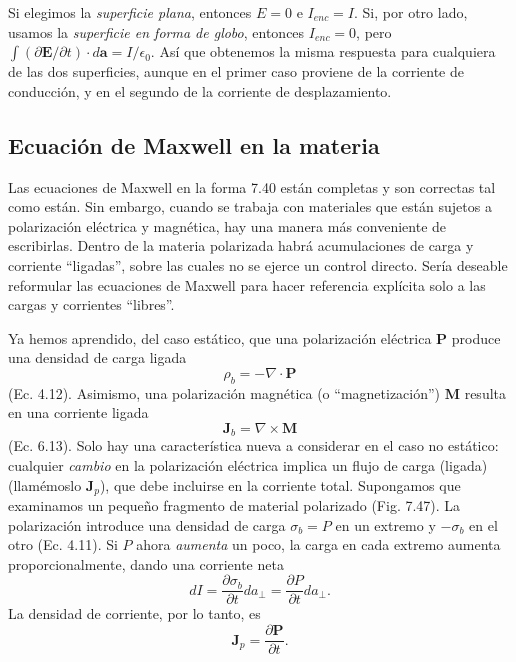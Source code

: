 \documentclass[12pt,a4paper]{report}
\begin{document}
	\noindent Si elegimos la \textit{superficie plana}, entonces $E = 0$ e $I_{enc} = I$. Si, por otro lado, usamos la \textit{superficie en forma de globo}, entonces $I_{enc} = 0$, pero $\int (\partial \mathbf{E} / \partial t) \cdot d\mathbf{a} = I / \epsilon_0$. Así que obtenemos la misma respuesta para cualquiera de las dos superficies, aunque en el primer caso proviene de la corriente de conducción, y en el segundo de la corriente de desplazamiento.
	
	\subsection{Ecuación de Maxwell en la materia}
	
	Las ecuaciones de Maxwell en la forma 7.40 están completas y son correctas tal como están. Sin embargo, cuando se trabaja con materiales que están sujetos a polarización eléctrica y magnética, hay una manera más conveniente de escribirlas. Dentro de la materia polarizada habrá acumulaciones de carga y corriente ``ligadas'', sobre las cuales no se ejerce un control directo. Sería deseable reformular las ecuaciones de Maxwell para hacer referencia explícita solo a las cargas y corrientes ``libres''.
	
	Ya hemos aprendido, del caso estático, que una polarización eléctrica $\mathbf{P}$ produce una densidad de carga ligada
	\begin{equation}
		\rho_b = -\nabla \cdot \mathbf{P} \tag{7.47}
	\end{equation}
	(Ec. 4.12). Asimismo, una polarización magnética (o ``magnetización'') $\mathbf{M}$ resulta en una corriente ligada
	\begin{equation}
		\mathbf{J}_b = \nabla \times \mathbf{M} \tag{7.48}
	\end{equation}
	(Ec. 6.13). Solo hay una característica nueva a considerar en el caso no estático: cualquier \textit{cambio} en la polarización eléctrica implica un flujo de carga (ligada) (llamémoslo $\mathbf{J}_p$), que debe incluirse en la corriente total. Supongamos que examinamos un pequeño fragmento de material polarizado (Fig. 7.47). La polarización introduce una densidad de carga $\sigma_b = P$ en un extremo y $-\sigma_b$ en el otro (Ec. 4.11). Si $P$ ahora \textit{aumenta} un poco, la carga en cada extremo aumenta proporcionalmente, dando una corriente neta
	\begin{equation*}
		dI = \frac{\partial \sigma_b}{\partial t} da_{\perp} = \frac{\partial P}{\partial t} da_{\perp}.
	\end{equation*}
	La densidad de corriente, por lo tanto, es
	\begin{equation}
		\mathbf{J}_p = \frac{\partial \mathbf{P}}{\partial t}. \tag{7.49}
	\end{equation}
	
\end{document}
